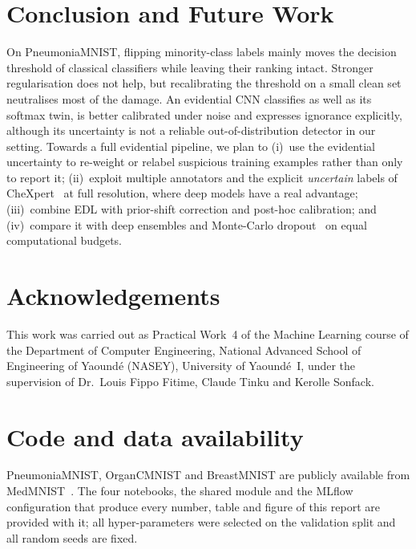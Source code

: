 \documentclass[11pt,a4paper]{article}
\begin{document}
\section{Conclusion and Future Work}
On PneumoniaMNIST, flipping minority-class labels mainly moves the decision threshold of classical classifiers while
leaving their ranking intact. Stronger regularisation does not help, but recalibrating the threshold on a small clean set
neutralises most of the damage. An evidential CNN classifies as well as its softmax twin, is better calibrated under
noise and expresses ignorance explicitly, although its uncertainty is not a reliable out-of-distribution detector in our
setting. Towards a full evidential pipeline, we plan to (i)~use the evidential uncertainty to re-weight or relabel
suspicious training examples rather than only to report it; (ii)~exploit multiple annotators and the explicit
\emph{uncertain} labels of CheXpert~\cite{irvin2019chexpert} at full resolution, where deep models have a real advantage;
(iii)~combine EDL with prior-shift correction and post-hoc calibration; and (iv)~compare it with deep ensembles and
Monte-Carlo dropout~\cite{lakshminarayanan2017simple,gal2016dropout} on equal computational budgets.

\section*{Acknowledgements}
This work was carried out as Practical Work~4 of the Machine Learning course of the Department of Computer Engineering,
National Advanced School of Engineering of Yaound\'e (NASEY), University of Yaound\'e~I, under the supervision of Dr.~Louis Fippo Fitime, Claude Tinku and Kerolle Sonfack.

\section*{Code and data availability}
PneumoniaMNIST, OrganCMNIST and BreastMNIST are publicly available from MedMNIST~\cite{yang2023medmnist}. The four
notebooks, the shared module and the MLflow configuration that produce every number, table and figure of this report
are provided with it; all hyper-parameters were selected on the validation split and all random seeds are fixed.




\appendix
\end{document}
